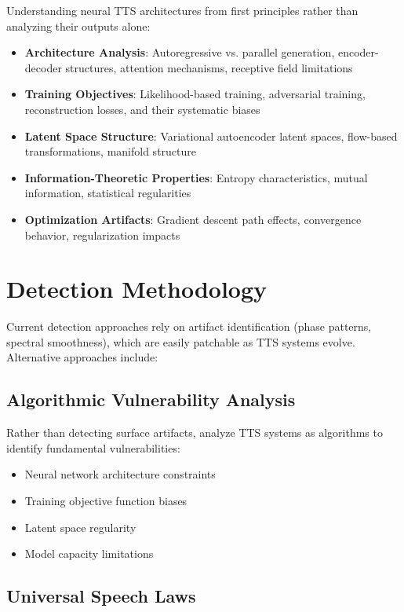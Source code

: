 \documentclass{article}
\begin{document}
Understanding neural TTS architectures from first principles rather than analyzing their outputs alone:

\begin{itemize}
    \item \textbf{Architecture Analysis}: Autoregressive vs. parallel generation, encoder-decoder structures, attention mechanisms, receptive field limitations
    \item \textbf{Training Objectives}: Likelihood-based training, adversarial training, reconstruction losses, and their systematic biases
    \item \textbf{Latent Space Structure}: Variational autoencoder latent spaces, flow-based transformations, manifold structure
    \item \textbf{Information-Theoretic Properties}: Entropy characteristics, mutual information, statistical regularities
    \item \textbf{Optimization Artifacts}: Gradient descent path effects, convergence behavior, regularization impacts
\end{itemize}

\section{Detection Methodology}

Current detection approaches rely on artifact identification (phase patterns, spectral smoothness), which are easily patchable as TTS systems evolve. Alternative approaches include:

\subsection{Algorithmic Vulnerability Analysis}

Rather than detecting surface artifacts, analyze TTS systems as algorithms to identify fundamental vulnerabilities:
\begin{itemize}
    \item Neural network architecture constraints
    \item Training objective function biases
    \item Latent space regularity
    \item Model capacity limitations
\end{itemize}

\subsection{Universal Speech Laws}
\end{document}
